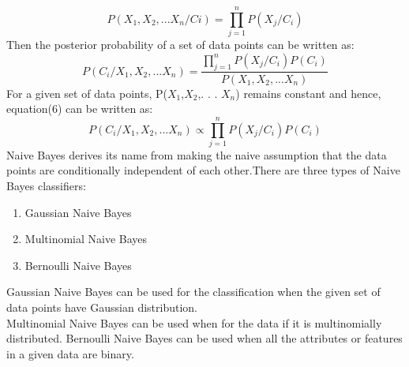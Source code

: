 \documentclass[sigconf]{acmart}
\begin{document}
\begin{equation}
    P(X_1,X_2,. . . X_n/Ci) = \prod_{j=1}^{n} P(X_j/C_i)
\end{equation}
Then the posterior probability of a set of data points can be written as:
\begin{equation}
    P(C_i/X_1,X_2,. . . X_n) = \frac{\prod_{j=1}^{n} P(X_j/C_i) P(C_i)}{P(X_1,X_2,. . . X_n) }	
\end{equation}
For a given set of data points, P($X_1$,$X_2$,. . . $X_n$) remains constant and hence, equation(6) can be written as:
\begin{equation}
    P(C_i/X_1,X_2,. . . X_n) \propto \prod_{j=1}^{n} P(X_j/C_i) P(C_i)
\end{equation}
Naive Bayes derives its name from making the naive assumption that the data points are conditionally independent of each other.There are three types of Naive Bayes classifiers:\cite{Crandall}
\begin{enumerate}
    \item Gaussian Naive Bayes
    \item Multinomial Naive Bayes
    \item Bernoulli Naive Bayes
\end{enumerate}
Gaussian Naive Bayes can be used for the classification when the given set of data points have Gaussian distribution.\cite{scikit-learn}\\
Multinomial Naive Bayes can be used when for the data if it is multinomially distributed\cite{scikit-learn}.
Bernoulli Naive Bayes can be used when all the attributes or features in a given data are binary\cite{scikit-learn}.
\end{document}
